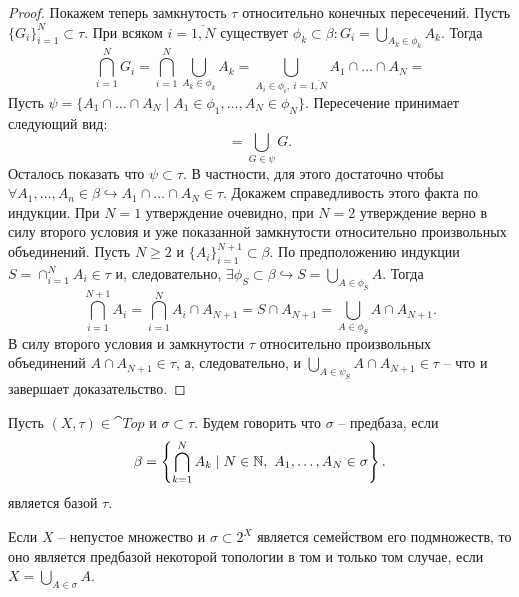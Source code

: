 \begin{proof}
    Покажем теперь замкнутость $\tau$ относительно конечных пересечений.
    Пусть $\{G_i\}_{i = 1}^N \subset \tau$.
    При всяком $i = \overline{1, N}$ существует $\phi_k \subset \beta\colon G_i = \bigcup_{A_k \in \phi_k} A_k$.
    Тогда
    \[
        \bigcap_{i = 1}^N G_i = \bigcap_{i = 1}^{N}\bigcup_{A_k \in \phi_k} A_k = \bigcup_{A_i \in \phi_i, \  i = \overline{1, N}} A_1 \cap \ldots \cap A_N = \tag{*}
    \]
    Пусть $\psi = \{A_1 \cap \ldots \cap A_N \mid A_1 \in \phi_1, \ldots, A_N \in \phi_N\}$.
    Пересечение принимает следующий вид:
    \[
        = \bigcup_{G \in \psi} G. \tag{*}
    \]
    Осталось показать что $\psi \subset \tau$.
    В частности, для этого достаточно чтобы $\forall A_1, \ldots, A_n \in \beta \hookrightarrow A_1 \cap \ldots \cap A_N \in \tau$.
    Докажем справедливость этого факта по индукции.
    При $N = 1$ утверждение очевидно, при $N = 2$ утверждение верно в силу второго условия и уже показанной замкнутости относительно произвольных объединений.
    Пусть $N \geq 2$ и $\{A_i\}_{i = 1}^{N + 1} \subset \beta$.
    По предположению индукции $S = \cap_{i = 1}^{N} A_i \in \tau$ и, следовательно, $\exists \phi_S \subset \beta \hookrightarrow S = \bigcup_{A \in \phi_S} A$.
    Тогда
    \[
        \bigcap_{i = 1}^{N + 1} A_i = \bigcap_{i = 1}^{N} A_i \cap A_{N + 1} = S \cap A_{N + 1} = \bigcup_{A \in \phi_S} A \cap A_{N + 1}.
    \]
    В силу второго условия и замкнутости $\tau$ относительно произвольных объединений $A \cap A_{N + 1} \in  \tau$, а, следовательно, и $\bigcup_{A \in \psi_S} A \cap A_{N + 1} \in \tau$ -- что и завершает доказательство.
\end{proof}
\begin{definition}
    Пусть $(X, \tau) \in \cat{Top}$ и $\sigma \subset \tau$.
    Будем говорить что $\sigma$ -- предбаза, если
    \[
        \beta = \left\{\bigcap_{k = 1}^{N} A_k \mid N \in \mathbb{N}, \ A_1, \ldots, A_N \in \sigma\right\}.
    \]
    является базой $\tau$.
\end{definition}
\begin{proposition}
    Если $X$ -- непустое множество и $\sigma \subset 2^X$ является семейством его подмножеств, то оно является предбазой некоторой топологии в том и только том случае, если $X = \bigcup_{A \in \sigma} A$.
\end{proposition}

